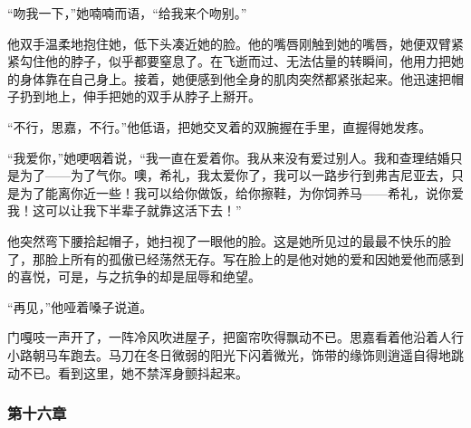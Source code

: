 \par “吻我一下，”她喃喃而语，“给我来个吻别。”
\par 他双手温柔地抱住她，低下头凑近她的脸。他的嘴唇刚触到她的嘴唇，她便双臂紧紧勾住他的脖子，似乎都要窒息了。在飞逝而过、无法估量的转瞬间，他用力把她的身体靠在自己身上。接着，她便感到他全身的肌肉突然都紧张起来。他迅速把帽子扔到地上，伸手把她的双手从脖子上掰开。
\par “不行，思嘉，不行。”他低语，把她交叉着的双腕握在手里，直握得她发疼。
\par “我爱你，”她哽咽着说，“我一直在爱着你。我从来没有爱过别人。我和查理结婚只是为了——为了气你。噢，希礼，我太爱你了，我可以一路步行到弗吉尼亚去，只是为了能离你近一些！我可以给你做饭，给你擦鞋，为你饲养马——希礼，说你爱我！这可以让我下半辈子就靠这活下去！”
\par 他突然弯下腰拾起帽子，她扫视了一眼他的脸。这是她所见过的最最不快乐的脸了，那脸上所有的孤傲已经荡然无存。写在脸上的是他对她的爱和因她爱他而感到的喜悦，可是，与之抗争的却是屈辱和绝望。
\par “再见，”他哑着嗓子说道。
\par 门嘎吱一声开了，一阵冷风吹进屋子，把窗帘吹得飘动不已。思嘉看着他沿着人行小路朝马车跑去。马刀在冬日微弱的阳光下闪着微光，饰带的缘饰则逍遥自得地跳动不已。看到这里，她不禁浑身颤抖起来。

\subsubsection{第十六章}

